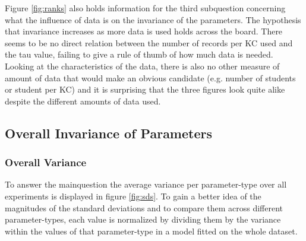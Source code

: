 \documentclass{scrartcl}
\begin{document}
Figure \ref{fig:ranks} also holds information for the third subquestion concerning what the influence of data is on the invariance of the parameters. The hypothesis that invariance increases as more data is used holds across the board. There seems to be no direct relation between the number of records per KC used and the tau value, failing to give a rule of thumb of how much data is needed. Looking at the characteristics of the data, there is also no other measure of amount of data that would make an obvious candidate (e.g. number of students or student per KC) and it is surprising that the three figures look quite alike despite the different amounts of data used.

\subsection{Overall Invariance of Parameters}
\label{sec:varresults}
\subsubsection{Overall Variance}
To answer the mainquestion the average variance per parameter-type over all experiments is displayed in figure \ref{fig:sds}. To gain a better idea of the magnitudes of the standard deviations and to compare them across different parameter-types, each value is normalized by dividing them by the variance within the values of that parameter-type in a model fitted on the whole dataset.
\end{document}

